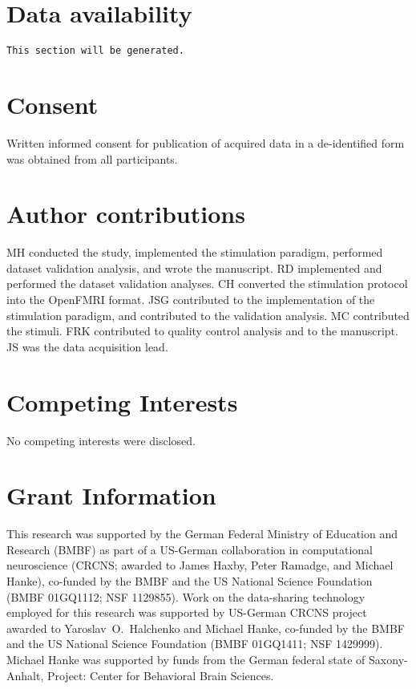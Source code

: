 \section*{Data availability}
\texttt{This section will be generated.}

\section*{Consent}

Written informed consent for publication of acquired data in a de-identified
form was obtained from all participants.

\section*{Author contributions}

MH conducted the study, implemented the stimulation paradigm, performed dataset validation analysis, and wrote the manuscript.
RD implemented and performed the dataset validation analyses.
CH converted the stimulation protocol into the OpenFMRI format.
JSG contributed to the implementation of the stimulation paradigm, and contributed to the validation analysis.
MC contributed the stimuli.
FRK contributed to quality control analysis and to the manuscript.
JS was the data acquisition lead.

\section*{Competing Interests}
No competing interests were disclosed.

\section*{Grant Information}

This research was supported by the German Federal Ministry of Education and
Research (BMBF) as part of a US-German collaboration in computational
neuroscience (CRCNS; awarded to James Haxby, Peter Ramadge, and Michael Hanke),
co-funded by the BMBF and the US National Science Foundation (BMBF 01GQ1112;
NSF 1129855). Work on the data-sharing technology employed for this research
was supported by US-German CRCNS project awarded to Yaroslav~O.~Halchenko and
Michael Hanke, co-funded by the BMBF and the US National Science Foundation
(BMBF 01GQ1411; NSF 1429999).  Michael Hanke was supported by funds from the
German federal state of Saxony-Anhalt, Project: Center for Behavioral Brain
Sciences.

